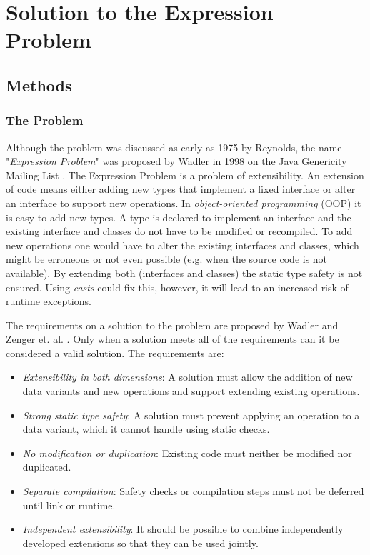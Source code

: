 \documentclass{report}
\begin{document}
\chapter{Solution to the Expression Problem}

\section{Methods}

\subsection{The Problem}
\label{theProblem}

Although the problem was discussed as early as 1975 by Reynolds, the name "\emph{Expression Problem}" was proposed by Wadler in 1998 on the Java Genericity Mailing List \cite{Reynolds-Abstraction-1975, Wadler-Expression-1998}. The Expression Problem is a problem of extensibility. An extension of code means either adding new types that implement a fixed interface or alter an interface to support new operations. In \emph{object-oriented programming} (OOP) it is easy to add new types. A type is declared to implement an interface and the existing interface and classes do not have to be modified or recompiled. To add new operations one would have to alter the existing interfaces and classes, which might be erroneous or not even possible (e.g. when the source code is not available). By extending both (interfaces and classes) the static type safety is not ensured. Using \emph{casts} could fix this, however, it will lead to an increased risk of runtime exceptions.

The requirements on a solution to the problem are proposed by Wadler and Zenger et. al. \cite{Wadler-Expression-1998, Odersky-Expression-2005, Oliv-Extensibility-2012}. Only when a solution meets all of the requirements can it be considered a valid solution. The requirements are:

\begin{itemize}
  \item \emph{Extensibility in both dimensions}: A solution must allow the addition of new data variants and new operations and support extending existing operations.
  \item \emph{Strong static type safety}: A solution must prevent applying an operation to a data variant, which it cannot handle using static checks.
  \item \emph{No modification or duplication}: Existing code must neither be modified nor duplicated.
  \item \emph{Separate compilation}: Safety checks or compilation steps must not be deferred until link or runtime.
  \item \emph{Independent extensibility}: It should be possible to combine independently developed extensions so that they can be used jointly.
\end{itemize}
\end{document}
